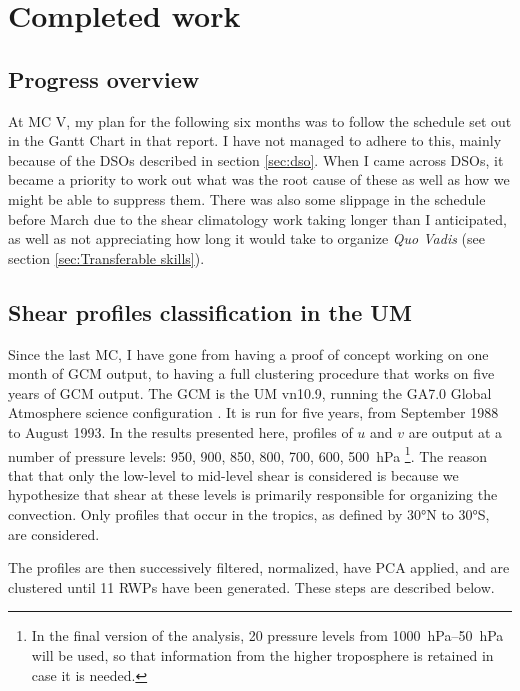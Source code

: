\documentclass[11pt,a4paper]{article}
\begin{document}
\section{Completed work}
\label{sec:Completed work}

\subsection{Progress overview}
\label{sec:Progress overview}

At MC V, my plan for the following six months was to follow the schedule set out in the Gantt Chart in that report. I have not managed to adhere to this, mainly because of the DSOs described in section \ref{sec:dso}. When I came across DSOs, it became a priority to work out what was the root cause of these as well as how we might be able to suppress them. There was also some slippage in the schedule before March due to the shear climatology work taking longer than I anticipated, as well as not appreciating how long it would take to organize \textit{Quo Vadis} (see section \ref{sec:Transferable skills}).

\subsection{Shear profiles classification in the UM}
\label{sec:Classification of shear profiles}
Since the last MC, I have gone from having a proof of concept working on one month of GCM output, to having a full clustering procedure that works on five years of GCM output. The GCM is the UM vn10.9, running the GA7.0 Global Atmosphere science configuration \parencite{walters2018met}. It is run for five years, from September 1988 to August 1993. In the results presented here, profiles of $u$ and $v$ are output at a number of pressure levels: \SI{950}{}, \SI{900}{}, \SI{850}{}, \SI{800}{}, \SI{700}{}, \SI{600}{}, \SI{500}{hPa} \footnote{In the final version of the analysis, 20 pressure levels from \SIrange{1000}{50}{hPa} will be used, so that information from the higher troposphere is retained in case it is needed.}. The reason that that only the low-level to mid-level shear is considered is because we hypothesize that shear at these levels is primarily responsible for organizing the convection. Only profiles that occur in the tropics, as defined by 30\si{\degree}N to 30\si{\degree}S, are considered.

The profiles are then successively filtered, normalized, have PCA applied, and are clustered until 11 RWPs have been generated. These steps are described below.
\end{document}
